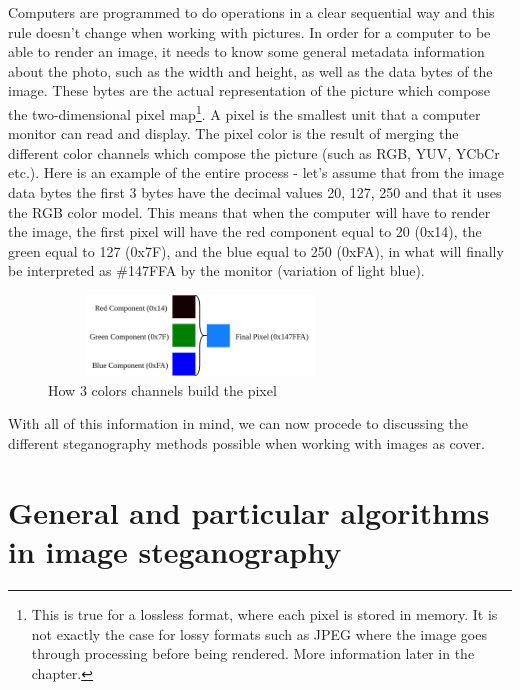 \begin{multicols*}{2}
Computers are programmed to do operations in a clear sequential way and this rule doesn't change when working with pictures. In order for a computer to be able to render an image, it needs to know some general metadata information about the photo, such as the width and height, as well as the data bytes of the image. These bytes are the actual representation of the picture which compose the two-dimensional pixel map\footnote{This is true for a lossless format, where each pixel is stored in memory. It is not exactly the case for lossy formats such as JPEG where the image goes through processing before being rendered. More information later in the chapter.}. A pixel is the smallest unit that a computer monitor can read and display. The pixel color is the result of merging the different color channels which compose the picture (such as RGB, YUV, YCbCr etc.). Here is an example of the entire process - let's assume that from the image data bytes the first 3 bytes have the decimal values 20, 127, 250 and that it uses the RGB color model. This means that when the computer will have to render the image, the first pixel will have the red component equal to 20 (0x14), the green equal to 127 (0x7F), and the blue equal to 250 (0xFA), in what will finally be interpreted as \#147FFA by the monitor (variation of light blue). 

\begin{figure}[H]
    \centering
    \includegraphics[width=8cm,height=2.15cm,keepaspectratio]{pics/how_a_pixel_works}
    \caption{How 3 colors channels build the pixel}
    \label{Pixel Creation}
\end{figure}

With all of this information in mind, we can now procede to discussing the different steganography methods possible when working with images as cover.

\end{multicols*}


\section{General and particular algorithms in image steganography}
